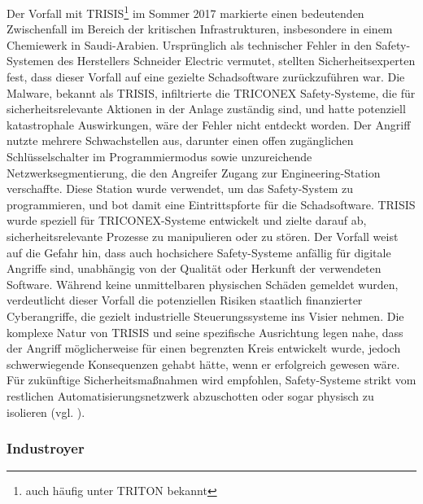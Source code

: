 Der Vorfall mit TRISIS\footnote{auch häufig unter TRITON bekannt} im Sommer 2017 markierte einen bedeutenden Zwischenfall im Bereich der kritischen Infrastrukturen, insbesondere in einem Chemiewerk in Saudi-Arabien. Ursprünglich als technischer Fehler in den Safety-Systemen des Herstellers Schneider Electric vermutet, stellten Sicherheitsexperten fest, dass dieser Vorfall auf eine gezielte Schadsoftware zurückzuführen war. Die Malware, bekannt als TRISIS, infiltrierte die TRICONEX Safety-Systeme, die für sicherheitsrelevante Aktionen in der Anlage zuständig sind, und hatte potenziell katastrophale Auswirkungen, wäre der Fehler nicht entdeckt worden. Der Angriff nutzte mehrere Schwachstellen aus, darunter einen offen zugänglichen Schlüsselschalter im Programmiermodus sowie unzureichende Netzwerksegmentierung, die den Angreifer Zugang zur Engineering-Station verschaffte. Diese Station wurde verwendet, um das Safety-System zu programmieren, und bot damit eine Eintrittspforte für die Schadsoftware. TRISIS wurde speziell für TRICONEX-Systeme entwickelt und zielte darauf ab, sicherheitsrelevante Prozesse zu manipulieren oder zu stören. Der Vorfall weist auf die Gefahr hin, dass auch hochsichere Safety-Systeme anfällig für digitale Angriffe sind, unabhängig von der Qualität oder Herkunft der verwendeten Software. Während keine unmittelbaren physischen Schäden gemeldet wurden, verdeutlicht dieser Vorfall die potenziellen Risiken staatlich finanzierter Cyberangriffe, die gezielt industrielle Steuerungssysteme ins Visier nehmen. Die komplexe Natur von TRISIS und seine spezifische Ausrichtung legen nahe, dass der Angriff möglicherweise für einen begrenzten Kreis entwickelt wurde, jedoch schwerwiegende Konsequenzen gehabt hätte, wenn er erfolgreich gewesen wäre. Für zukünftige Sicherheitsmaßnahmen wird empfohlen, Safety-Systeme strikt vom restlichen Automatisierungsnetzwerk abzuschotten oder sogar physisch zu isolieren (vgl. \cite{TRISIS}).

\subsubsection{Industroyer}

